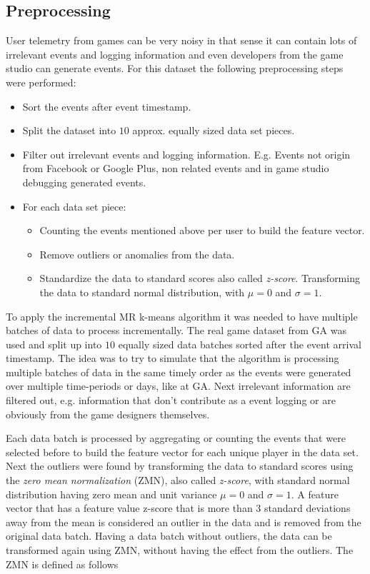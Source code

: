 \subsection{Preprocessing}
\label{preprocessing}
User telemetry from games can be very noisy in that sense it can contain lots of irrelevant events and logging information and even developers from the game studio can generate events. For this dataset the following preprocessing steps were performed:
\begin{itemize}
\item Sort the events after event timestamp.
\item Split the dataset into $10$ approx. equally sized data set pieces.
\item Filter out irrelevant events and logging information. E.g. Events not origin from Facebook or Google Plus, non related events and in game studio debugging generated events.
\item For each data set piece:
 \begin{itemize}
 \item Counting the events mentioned above per user to build the feature vector.
 \item Remove outliers or anomalies from the data.
 \item Standardize the data to standard scores also called \textit{z-score}. Transforming the data
to standard normal distribution, with $\mu = 0$ and $\sigma = 1$. 
 \end{itemize}
\end{itemize}

To apply the incremental MR k-means algorithm it was needed to have multiple batches of data to process incrementally. The real game dataset from GA was used and split up into $10$ equally sized data batches sorted after the event arrival timestamp. The idea was to try to simulate that the algorithm is processing multiple batches of data in the same timely order as the events were generated over multiple time-periods or days, like at GA. Next irrelevant information are filtered out, e.g. information that don't contribute as a event logging or are obviously from the game designers themselves.

Each data batch is processed by aggregating or counting the events that were selected before to build the feature vector for each unique player in the data set. Next the outliers were found by transforming the data to standard scores using the \textit{zero mean normalization} (ZMN), also called \textit{z-score}, with standard normal distribution having zero mean and unit variance $\mu = 0$ and $\sigma = 1$. A feature vector that has a feature value z-score that is more than $3$ standard deviations away from the mean is considered an outlier in the data and is removed from the original data batch. Having a data batch without outliers, the data can be transformed again using ZMN, without having the effect from the outliers. The ZMN is defined as follows


